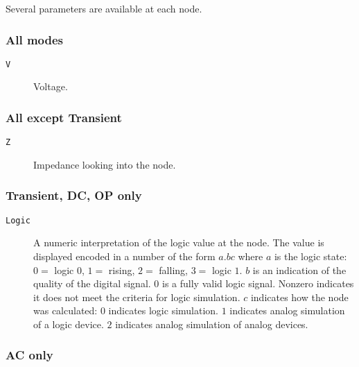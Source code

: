 Several parameters are available at each node.
\subsubsection{All modes}

\begin{description}

\item[{\tt V}] Voltage.

\end{description}
\subsubsection{All except Transient}

\begin{description}

\item[{\tt Z}] Impedance looking into the node.

\end{description}
\subsubsection{Transient, DC, OP only}
\begin{description}

\item[{\tt Logic}] A numeric interpretation of the logic value at the node.
The value is displayed encoded in a number of the form $a.bc$ where $a$ is
the logic state: $0 =$ logic $0$, $1 =$ rising, $2 =$ falling, $3 =$ logic
$1$.  $b$ is an indication of the quality of the digital signal.  $0$ is a
fully valid logic signal.  Nonzero indicates it does not meet the criteria
for logic simulation.  $c$ indicates how the node was calculated:  $0$
indicates logic simulation.  $1$ indicates analog simulation of a logic
device.  $2$ indicates analog simulation of analog devices.

\end{description}
\subsubsection{AC only}

